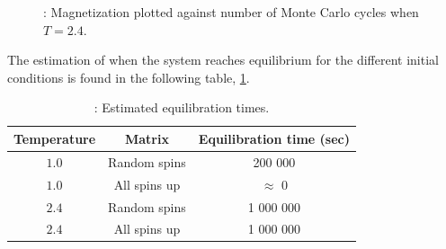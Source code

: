 \documentclass{article}
\begin{document}
{		\begin{figure}[H]
		\caption{: Magnetization plotted against number of Monte Carlo cycles when $T = 2.4$. }
		\label{fig:steady_M_highT}
		\end{figure}

		The estimation of when the system reaches equilibrium for the different initial conditions is found in the following table, \ref{Tab:equilibration_times}.

		{\renewcommand{\arraystretch}{1.5}
		\begin{table}[h!]
			\caption{: Estimated equilibration times.}
				\label{Tab:equilibration_times}
				\centering
			\begin{tabular}{c c c}
					Temperature & Matrix & Equilibration time (sec)\\
					\hline
					$1.0$ & Random spins & 200 000  \\
					$1.0$ & All spins up & $\approx$ 0 \\
					$2.4$ & Random spins & 1 000 000\\
					$2.4$ & All spins up & 1 000 000\\
				\hline
			\end{tabular}
		\end{table}

}}
\end{document}

